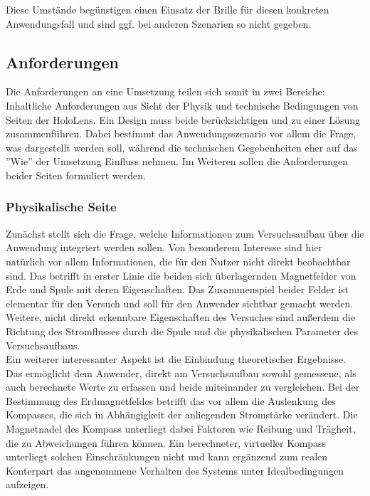 Diese Umstände begünstigen einen Einsatz der Brille für diesen konkreten Anwendungsfall und sind ggf. bei anderen Szenarien so nicht gegeben.

\subsection{Anforderungen}
\label{sec-3-1}
Die Anforderungen an eine Umsetzung teilen sich somit in zwei Bereiche: Inhaltliche Anforderungen aus Sicht der Physik und technische Bedingungen von Seiten der HoloLens. Ein Design muss beide berücksichtigen und zu einer Lösung zusammenführen. Dabei bestimmt das Anwendungsszenario vor allem die Frage, was dargestellt werden soll, während die technischen Gegebenheiten eher auf das ''Wie'' der Umsetzung Einfluss nehmen. Im Weiteren sollen die Anforderungen beider Seiten formuliert werden.

\subsubsection{Physikalische Seite}
Zunächst stellt sich die Frage, welche Informationen zum Versuchsaufbau über die Anwendung integriert werden sollen. Von besonderem Interesse sind hier natürlich vor allem Informationen, die für den Nutzer nicht direkt beobachtbar sind. Das betrifft in erster Linie die beiden sich überlagernden Magnetfelder von Erde und Spule mit deren Eigenschaften. Das Zusammenspiel beider Felder ist elementar für den Versuch und soll für den Anwender sichtbar gemacht werden. Weitere, nicht direkt erkennbare Eigenschaften des Versuches sind außerdem die Richtung des Stromflusses durch die Spule und die physikalischen Parameter des Versuchsaufbaus.\\

Ein weiterer interessanter Aspekt ist die Einbindung theoretischer Ergebnisse. Das ermöglicht dem Anwender, direkt am Versuchsaufbau sowohl gemessene, als auch berechnete Werte zu erfassen und beide miteinander zu vergleichen. Bei der Bestimmung des Erdmagnetfeldes betrifft das vor allem die Auslenkung des Kompasses, die sich in Abhängigkeit der anliegenden Stromstärke verändert. Die Magnetnadel des Kompass unterliegt dabei Faktoren wie Reibung und Trägheit, die zu Abweichungen führen können. Ein berechneter, virtueller Kompass unterliegt solchen Einschränkungen nicht und kann ergänzend zum realen Konterpart das angenommene Verhalten des Systems unter Idealbedingungen aufzeigen.\\

